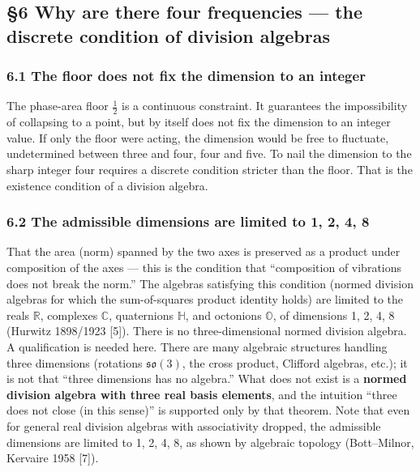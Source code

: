 \documentclass[
]{article}
\begin{document}
\subsection{§6 Why are there four frequencies --- the discrete condition
of division
algebras}\label{why-are-there-four-frequencies-the-discrete-condition-of-division-algebras}

\subsubsection{6.1 The floor does not fix the dimension to an
integer}\label{the-floor-does-not-fix-the-dimension-to-an-integer}

The phase-area floor \(\tfrac12\) is a continuous constraint. It
guarantees the impossibility of collapsing to a point, but by itself
does not fix the dimension to an integer value. If only the floor were
acting, the dimension would be free to fluctuate, undetermined between
three and four, four and five. To nail the dimension to the sharp
integer four requires a discrete condition stricter than the floor. That
is the existence condition of a division algebra.

\subsubsection{6.2 The admissible dimensions are limited to 1, 2, 4,
8}\label{the-admissible-dimensions-are-limited-to-1-2-4-8}

That the area (norm) spanned by the two axes is preserved as a product
under composition of the axes --- this is the condition that
``composition of vibrations does not break the norm.'' The algebras
satisfying this condition (normed division algebras for which the
sum-of-squares product identity holds) are limited to the reals
\(\mathbb{R}\), complexes \(\mathbb{C}\), quaternions \(\mathbb{H}\),
and octonions \(\mathbb{O}\), of dimensions 1, 2, 4, 8 (Hurwitz
1898/1923 {[}5{]}). There is no three-dimensional normed division
algebra. A qualification is needed here. There are many algebraic
structures handling three dimensions (rotations \(\mathfrak{so}(3)\),
the cross product, Clifford algebras, etc.); it is not that ``three
dimensions has no algebra.'' What does not exist is a \textbf{normed
division algebra with three real basis elements}, and the intuition
``three does not close (in this sense)'' is supported only by that
theorem. Note that even for general real division algebras with
associativity dropped, the admissible dimensions are limited to 1, 2, 4,
8, as shown by algebraic topology (Bott--Milnor, Kervaire 1958 {[}7{]}).
\end{document}

